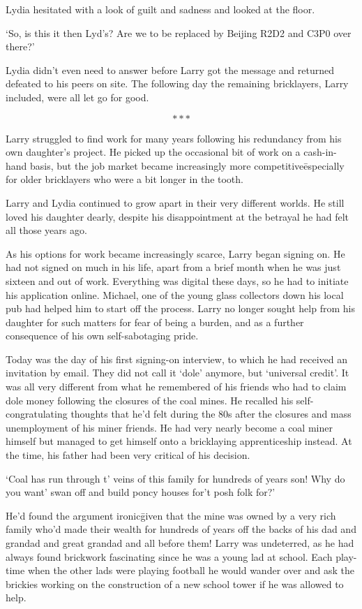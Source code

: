 Lydia hesitated with a look of guilt and sadness and looked at the
floor.

`So, is this it then Lyd's? Are we to be replaced by Beijing R2D2 and
C3P0 over there?'

Lydia didn't even need to answer before Larry got the message and
returned defeated to his peers on site. The following day the
remaining bricklayers, Larry included, were all let go for good.

\[***\]

Larry struggled to find work for many years following his redundancy
from his own daughter's project. He picked up the occasional bit of
work on a cash-in-hand basis, but the job market became increasingly
more competitive\=especially for older bricklayers who were a bit
longer in the tooth.

Larry and Lydia continued to grow apart in their very different
worlds. He still loved his daughter dearly, despite his disappointment
at the betrayal he had felt all those years ago.

As his options for work became increasingly scarce, Larry began
signing on. He had not signed on much in his life, apart from a brief
month when he was just sixteen and out of work. Everything was digital
these days, so he had to initiate his application online. Michael, one
of the young glass collectors down his local pub had helped him to
start off the process. Larry no longer sought help from his daughter
for such matters for fear of being a burden, and as a further
consequence of his own self-sabotaging pride.

Today was the day of his first signing-on interview, to which he had
received an invitation by email. They did not call it `dole' anymore,
but `universal credit'. It was all very different from what he
remembered of his friends who had to claim dole money following the
closures of the coal mines. He recalled his self-congratulating
thoughts that he'd felt during the 80s after the closures and mass
unemployment of his miner friends. He had very nearly become a coal
miner himself but managed to get himself onto a bricklaying
apprenticeship instead. At the time, his father had been very critical
of his decision.

`Coal has run through t' veins of this family for hundreds of years
son! Why do you want' swan off and build poncy houses for't posh folk
for?'

He'd found the argument ironic\=given that the mine was owned by a
very rich family who'd made their wealth for hundreds of years off the
backs of his dad and grandad and great grandad and all before them!
Larry was undeterred, as he had always found brickwork fascinating
since he was a young lad at school. Each play-time when the other lads
were playing football he would wander over and ask the brickies
working on the construction of a new school tower if he was allowed to
help.

